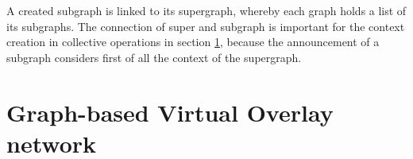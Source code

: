 A created subgraph is linked to its supergraph, whereby each graph
holds a list of its subgraphs. The connection of super and subgraph is
important for the context creation in collective operations in section
\ref{sec:gvon_impl}, because the announcement of a subgraph considers
first of all the context of the supergraph.


\section{Graph-based Virtual Overlay network}
\label{sec:gvon_impl}

